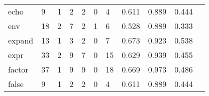 \begin{longtable}{lp{1.20cm}p{1.20cm}p{1.20cm}p{1.20cm}p{1.20cm}p{1.20cm}p{1.20cm}p{1.20cm}p{1.20cm}p{1.20cm}}
echo      &                                     9 &                                                  1 &                                                  2 &                                                  2 &                                                  0 &                                                  4 &                                         0.611 &                                              0.889 &                                              0.444 \\
env       &                                    18 &                                                  2 &                                                  7 &                                                  2 &                                                  1 &                                                  6 &                                         0.528 &                                              0.889 &                                              0.333 \\
expand    &                                    13 &                                                  1 &                                                  3 &                                                  2 &                                                  0 &                                                  7 &                                         0.673 &                                              0.923 &                                              0.538 \\
expr      &                                    33 &                                                  2 &                                                  9 &                                                  7 &                                                  0 &                                                 15 &                                         0.629 &                                              0.939 &                                              0.455 \\
factor    &                                    37 &                                                  1 &                                                  9 &                                                  9 &                                                  0 &                                                 18 &                                         0.669 &                                              0.973 &                                              0.486 \\
false     &                                     9 &                                                  1 &                                                  2 &                                                  2 &                                                  0 &                                                  4 &                                         0.611 &                                              0.889 &                                              0.444 \\

\end{longtable}
